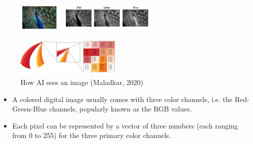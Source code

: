 \begin{vbframe}

 \begin{figure}
    \centering
    \includegraphics[width=7cm]{figure/RGB.jpeg}
  \end{figure}

 \begin{figure}
    \centering
    \includegraphics[width=5cm]{figure/RGB-1.png}
    \caption{How AI sees an image (Maladkar, 2020)}
  \end{figure}

\begin{itemize}
       \item A colored digital image usually comes with three color channels, i.e. the Red-Green-Blue channels, popularly known as the RGB values.   
        \item Each pixel can be represented by a vector of three numbers (each ranging from 0 to 255) for the three primary color channels.
\end{itemize}



  
  
\end{vbframe}



